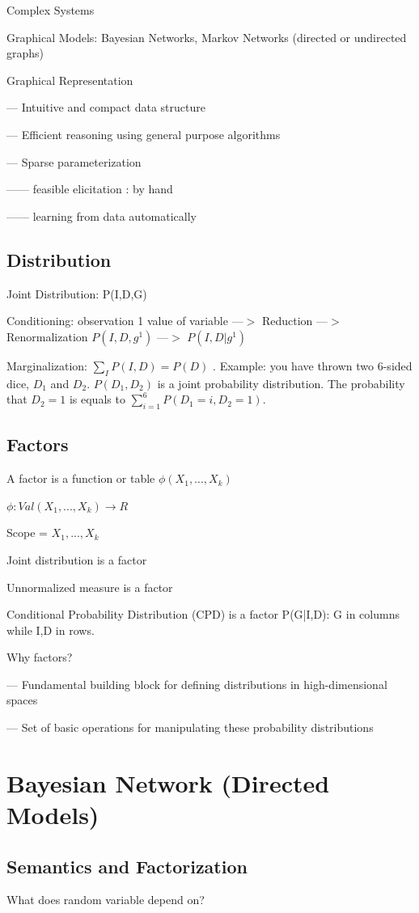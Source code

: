 \documentclass{book}
\begin{document}
Complex Systems

Graphical Models: Bayesian Networks, Markov Networks (directed or undirected graphs)

Graphical Representation

--- Intuitive and compact data structure

--- Efficient reasoning using general purpose algorithms

--- Sparse parameterization

------ feasible elicitation : by hand

------ learning from data automatically

\subsection{Distribution}
Joint Distribution: P(I,D,G)

Conditioning: observation 1 value of variable ---$>$ Reduction ---$>$ Renormalization $P(I,D,g^1)$  ---$>$ $P(I,D|g^1)$


Marginalization: $\sum_{I}P(I,D) = P(D)$ . Example: you have thrown two 6-sided dice, $D_1$ and $D_2$. $P(D_1,D_2)$ is a joint probability distribution. The probability that $D_2=1$ is equals to $\sum_{i=1}^{6}P(D_1 = i, D_2=1)$.

\subsection{Factors}
A factor is a function or table $\phi(X_1,...,X_k)$

$\phi: Val(X_1,...,X_k) \rightarrow R$

Scope = ${X_1,...,X_k}$

Joint distribution is a factor

Unnormalized measure is a factor

Conditional Probability Distribution (CPD) is a factor P(G|I,D): G in columns while I,D in rows.

Why factors?

--- Fundamental building block for defining distributions in high-dimensional spaces

--- Set of basic operations for manipulating these probability distributions

\section{Bayesian Network (Directed Models)}
\subsection{Semantics and Factorization}
What does random variable depend on?
\end{document}
